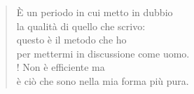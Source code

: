 
\begin{verse}
    È un periodo in cui metto in dubbio\\
    la qualità di quello che scrivo:\\
    questo è il metodo che ho\\
    per mettermi in discussione come uomo.\\!
    Non è efficiente ma\\
    è ciò che sono nella mia forma più pura.
    
    
\end{verse}